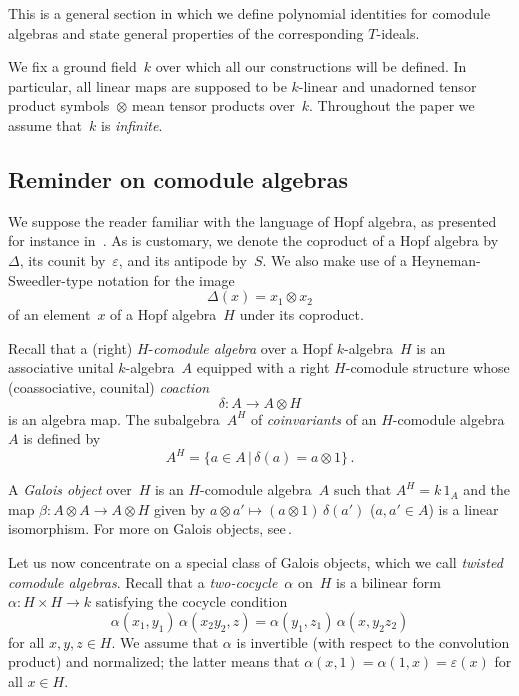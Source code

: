 \documentclass[11pt, a4paper]{amsart}
\theoremstyle{definition}
\numberwithin{equation}{section}
\begin{document}
This is a general section in which we define polynomial identities for comodule algebras
and state general properties of the corresponding $T$-ideals.

We fix a ground field~$k$ over which all our constructions will be defined. 
In particular, all linear maps are supposed to be $k$-linear
and unadorned tensor product symbols~$\otimes$ mean tensor products over~$k$.
Throughout the paper we assume that~$k$ is \emph{infinite}.

\subsection{Reminder on comodule algebras}\label{ssec-prel}

We suppose the reader familiar with the language of Hopf algebra, as presented for instance in~\cite{M2, Sw}.
As is customary, we denote the coproduct of a Hopf algebra by~$\Delta$, its counit by~${\varepsilon}$,
and its antipode by~$S$.
We also make use of a Heyneman-Sweedler-type notation 
for the image 
\[
\Delta(x) = x_1 \otimes x_2
\]
of an element~$x$ of a Hopf algebra~$H$ under its coproduct.

Recall that a (right) $H$-\emph{comodule algebra} over a Hopf $k$-algebra~$H$
is an associative unital $k$-algebra~$A$ 
equipped with a right $H$-comodule structure whose (coassociative, counital) \emph{coaction}
\[
\delta : A \to A \otimes H
\] 
is an algebra map.
The subalgebra~$A^H$ of \emph{coin\-var\-iants} of an $H$-comodule algebra~$A$
is defined by
\begin{equation*}
A^H = \{ a \in A \, | \, \delta(a)  = a \otimes 1\} \, .
\end{equation*}

A \emph{Galois object} over~$H$ is an $H$-comodule algebra~$A$ such that $A^H = k\, 1_A$
and the map $\beta: A \otimes A \to A \otimes H$ given by $a\otimes a' \mapsto (a\otimes 1) \, \delta(a')$
($a,a'\in A$) is a linear isomorphism. For more on Galois objects, see\,\cite[Chap.~8]{M2}.

Let us now concentrate on a special class of Galois objects,
which we call \emph{twisted comodule algebras}.
Recall that a \emph{two-cocycle}~$\alpha$ on~$H$ is 
a bilinear form $\alpha : H \times H \to k$ satisfying the cocycle condition
\begin{equation*}\label{cocycle}
\alpha(x_1,y_1)\, \alpha(x_2 y_2, z)
= \alpha(y_1, z_1)\, \alpha(x, y_2 z_2)
\end{equation*}
for all $x,y,z \in H$.
We assume that $\alpha$ is invertible (with respect to the convolution product)
and normalized; the latter means that 
$\alpha(x,1)  = \alpha(1,x) = \varepsilon(x)$ for all $x\in H$.
\end{document}

